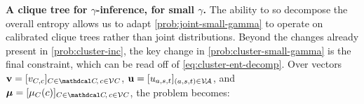 \documentclass[twoside]{article}
\begin{document}
\textbf{A clique tree for $\gamma$-inference, for small $\gamma$.}
The ability to so decompose the overall entropy allows us to adapt 
\eqref{prob:joint-small-gamma} to operate on calibrated clique trees 
rather than joint distributions. 
Beyond the changes already present in \eqref{prob:cluster-inc},
the key change in \eqref{prob:cluster-small-gamma} 
is the final constraint, which can be read off of 
\eqref{eq:cluster-ent-decomp}.
%
Over
vectors $\mat v = [v_{C,c}]_{C \in \mathdcal C\!,\,c \in \V C}$,
$\mathbf{u} = [u_{a,s,t}]_{(a,s,t) \in \mathcal V\!\mathcal A}$,
and $\bmu = [ \mu_{C}(c) ]_{C \in \mathdcal C\!,\,c \in \V C}$,
the problem becomes: 
\end{document}
